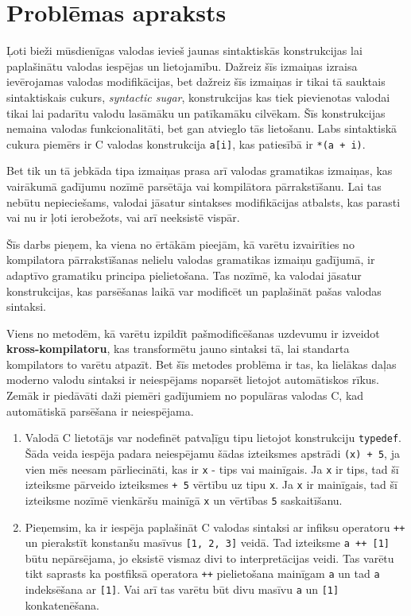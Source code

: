\section{Problēmas apraksts}
Ļoti bieži mūsdienīgas valodas ievieš jaunas sintaktiskās konstrukcijas lai paplašinātu valodas iespējas un lietojamību. Dažreiz šīs izmaiņas izraisa ievērojamas valodas modifikācijas, bet dažreiz šīs izmaiņas ir tikai tā sauktais sintaktiskais cukurs, \emph{syntactic sugar}, konstrukcijas kas tiek pievienotas valodai tikai lai padarītu valodu lasāmāku un patīkamāku cilvēkam. Šīs konstrukcijas nemaina valodas funkcionalitāti, bet gan atvieglo tās lietošanu. Labs sintaktiskā cukura piemērs ir C valodas konstrukcija \verb|a[i]|, kas patiesībā ir \verb|*(a + i)|.

Bet tik un tā jebkāda tipa izmaiņas prasa arī valodas gramatikas izmaiņas, kas vairākumā gadījumu nozīmē parsētāja vai kompilātora pārrakstīšanu. Lai tas nebūtu nepieciešams, valodai jāsatur sintakses modifikācijas atbalsts, kas parasti vai nu ir ļoti ierobežots, vai arī neeksistē vispār.

Šīs darbs pieņem, ka viena no ērtākām pieejām, kā varētu izvairīties no kompilatora pārrakstīšanas nelielu valodas gramatikas izmaiņu gadījumā, ir adaptīvo gramatiku principa pielietošana. Tas nozīmē, ka valodai jāsatur konstrukcijas, kas parsēšanas laikā var modificēt un paplašināt pašas valodas sintaksi. 

Viens no metodēm, kā varētu izpildīt pašmodificēšanas uzdevumu ir izveidot \textbf{kross-kompilatoru}, kas transformētu jauno sintaksi tā, lai standarta kompilators to varētu atpazīt. Bet šīs metodes problēma ir tas, ka lielākas daļas moderno valodu sintaksi ir neiespējams noparsēt lietojot automātiskos rīkus. Zemāk ir piedāvāti daži piemēri gadījumiem no populāras valodas C, kad automātiskā parsēšana ir neiespējama.

\begin{enumerate}
\item
Valodā C lietotājs var nodefinēt patvaļīgu tipu lietojot konstrukciju \verb|typedef|. Šāda veida iespēja padara neiespējamu šādas izteiksmes apstrādi \verb|(x) + 5|, ja vien mēs neesam pārliecināti, kas ir \verb|x| - tips vai mainīgais. Ja \verb|x| ir tips, tad šī izteiksme pārveido izteiksmes \verb|+ 5| vērtību uz tipu \verb|x|. Ja \verb|x| ir mainīgais, tad šī izteiksme nozīmē vienkāršu mainīgā \verb|x| un vērtības \verb|5| saskaitīšanu. 
\item
Pieņemsim, ka ir iespēja paplašināt C valodas sintaksi ar infiksu operatoru \verb|++| un pierakstīt konstanšu masīvus \verb|[1, 2, 3]| veidā. Tad izteiksme \verb|a ++ [1]| būtu nepārsējama, jo eksistē vismaz divi to interpretācijas veidi. Tas varētu tikt saprasts ka postfiksā operatora \verb|++| pielietošana mainīgam \verb|a| un tad \verb|a| indeksēšana ar \verb|[1]|. Vai arī tas varētu būt divu masīvu \verb|a| un \verb|[1]| konkatenēšana.
\end{enumerate}

